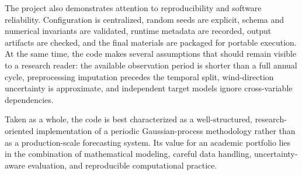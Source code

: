 \documentclass[11pt,a4paper]{article}
\begin{document}
The project also demonstrates attention to reproducibility and software reliability. Configuration is centralized, random seeds are explicit, schema and numerical invariants are validated, runtime metadata are recorded, output artifacts are checked, and the final materials are packaged for portable execution. At the same time, the code makes several assumptions that should remain visible to a research reader: the available observation period is shorter than a full annual cycle, preprocessing imputation precedes the temporal split, wind-direction uncertainty is approximate, and independent target models ignore cross-variable dependencies.

Taken as a whole, the code is best characterized as a well-structured, research-oriented implementation of a periodic Gaussian-process methodology rather than as a production-scale forecasting system. Its value for an academic portfolio lies in the combination of mathematical modeling, careful data handling, uncertainty-aware evaluation, and reproducible computational practice.
\end{document}
